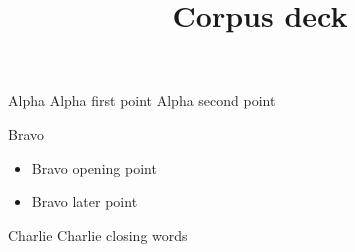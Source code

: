 \documentclass{beamer}
\title{Corpus deck}
\begin{document}
\begin{frame}{Alpha}
  Alpha first point \pause Alpha second point
\end{frame}
\begin{frame}{Bravo}
  \begin{itemize}
    \item Bravo opening point
    \item<2-> Bravo later point
  \end{itemize}
\end{frame}
\begin{frame}{Charlie}
  Charlie closing words
\end{frame}
\end{document}
